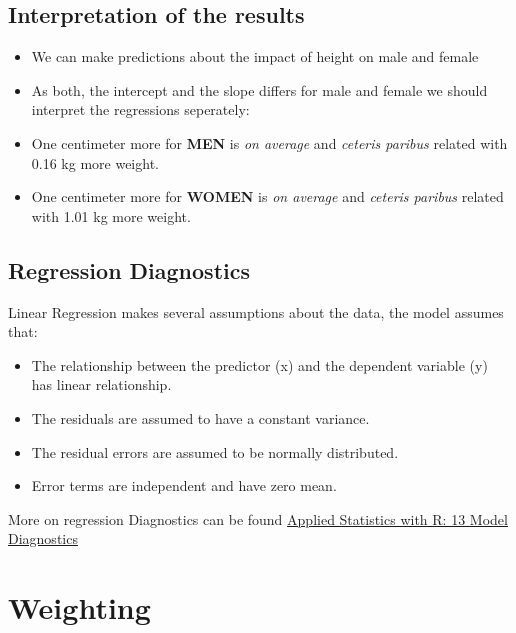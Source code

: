 \documentclass[
  doc]{apa6}
\providecommand{\tightlist}{%
  \setlength{\itemsep}{0pt}\setlength{\parskip}{0pt}}
\begin{document}
\newpage

\subsection{Interpretation of the results}\label{interpretation-of-the-results}

\begin{itemize}
\tightlist
\item
  We can make predictions about the impact of height on male and female
\item
  As both, the intercept and the slope differs for male and female we should interpret the regressions seperately:
\item
  One centimeter more for \textbf{MEN} is \emph{on average} and \emph{ceteris paribus} related with 0.16 kg more weight.
\item
  One centimeter more for \textbf{WOMEN} is \emph{on average} and \emph{ceteris paribus} related with 1.01 kg more weight.
\end{itemize}

\subsection{Regression Diagnostics}\label{regression-diagnostics}

Linear Regression makes several assumptions about the data, the model assumes that:

\begin{itemize}
\tightlist
\item
  The relationship between the predictor (x) and the dependent variable (y) has linear relationship.
\item
  The residuals are assumed to have a constant variance.
\item
  The residual errors are assumed to be normally distributed.
\item
  Error terms are independent and have zero mean.
\end{itemize}

More on regression Diagnostics can be found \href{https://daviddalpiaz.github.io/appliedstats/model-diagnostics.html\#r-markdown-6}{Applied Statistics with R: 13 Model Diagnostics}

\newpage

\section{Weighting}\label{weighting}
\end{document}
